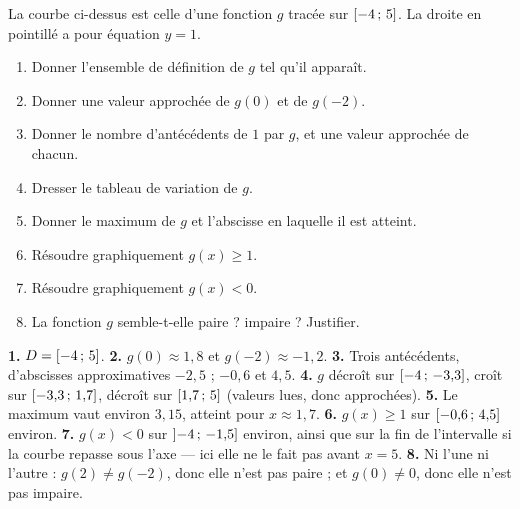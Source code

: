 \begin{lecturegraphique}
\begin{center}
\end{center}

La courbe ci-dessus est celle d'une fonction $g$ tracée sur
$\left[-4\,;\,5\right]$. La droite en pointillé a pour équation $y = 1$.

\begin{enumerate}[label=\textbf{\arabic*.}, leftmargin=*, itemsep=0.25em]
  \item Donner l'ensemble de définition de $g$ tel qu'il apparaît.
  \item Donner une valeur approchée de $g(0)$ et de $g(-2)$.
  \item Donner le nombre d'antécédents de $1$ par $g$, et une valeur
        approchée de chacun.
  \item Dresser le tableau de variation de $g$.
  \item Donner le maximum de $g$ et l'abscisse en laquelle il est atteint.
  \item Résoudre graphiquement $g(x) \geq 1$.
  \item Résoudre graphiquement $g(x) < 0$.
  \item La fonction $g$ semble-t-elle paire ? impaire ? Justifier.
\end{enumerate}
\end{lecturegraphique}

\begin{corrige}
\textbf{1.} $D = \left[-4\,;\,5\right]$.
\textbf{2.} $g(0) \approx 1{,}8$ et $g(-2) \approx -1{,}2$.
\textbf{3.} Trois antécédents, d'abscisses approximatives $-2{,}5$ ;
$-0{,}6$ et $4{,}5$.
\textbf{4.} $g$ décroît sur $\left[-4\,;\,-3{,}3\right]$, croît sur
$\left[-3{,}3\,;\,1{,}7\right]$, décroît sur $\left[1{,}7\,;\,5\right]$
(valeurs lues, donc approchées).
\textbf{5.} Le maximum vaut environ $3{,}15$, atteint pour
$x \approx 1{,}7$.
\textbf{6.} $g(x) \geq 1$ sur $\left[-0{,}6\,;\,4{,}5\right]$ environ.
\textbf{7.} $g(x) < 0$ sur $\left]-4\,;\,-1{,}5\right]$ environ, ainsi que
sur la fin de l'intervalle si la courbe repasse sous l'axe — ici elle ne le
fait pas avant $x = 5$.
\textbf{8.} Ni l'une ni l'autre : $g(2) \neq g(-2)$, donc elle n'est pas
paire ; et $g(0) \neq 0$, donc elle n'est pas impaire.
\end{corrige}

